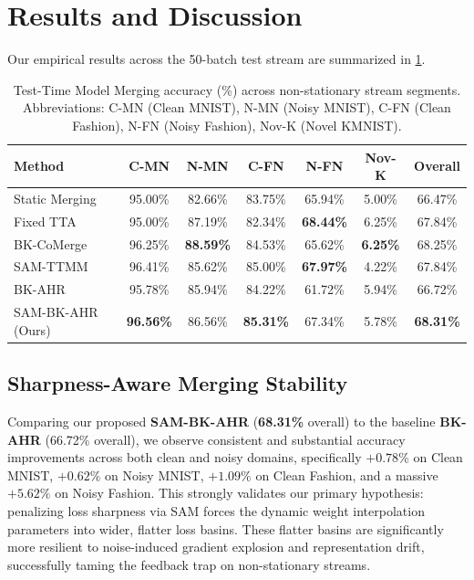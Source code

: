 \documentclass{article}
\theoremstyle{plain}
\theoremstyle{definition}
\theoremstyle{remark}
\begin{document}
\section{Results and Discussion}
\label{sec:results}

Our empirical results across the 50-batch test stream are summarized in \cref{tab:results}.

\begin{table}[t]
\caption{Test-Time Model Merging accuracy (\%) across non-stationary stream segments. Abbreviations: C-MN (Clean MNIST), N-MN (Noisy MNIST), C-FN (Clean Fashion), N-FN (Noisy Fashion), Nov-K (Novel KMNIST).}
\label{tab:results}
\vskip 0.15in
\begin{center}
\begin{small}
\begin{sc}
\begin{tabular}{lcccccc}
\toprule
Method & C-MN & N-MN & C-FN & N-FN & Nov-K & Overall \\
\midrule
Static Merging & 95.00\% & 82.66\% & 83.75\% & 65.94\% & 5.00\% & 66.47\% \\
Fixed TTA & 95.00\% & 87.19\% & 82.34\% & \textbf{68.44\%} & 6.25\% & 67.84\% \\
BK-CoMerge & 96.25\% & \textbf{88.59\%} & 84.53\% & 65.62\% & \textbf{6.25\%} & 68.25\% \\
SAM-TTMM & 96.41\% & 85.62\% & 85.00\% & \textbf{67.97\%} & 4.22\% & 67.84\% \\
BK-AHR & 95.78\% & 85.94\% & 84.22\% & 61.72\% & 5.94\% & 66.72\% \\
SAM-BK-AHR (Ours) & \textbf{96.56\%} & 86.56\% & \textbf{85.31\%} & 67.34\% & 5.78\% & \textbf{68.31\%} \\
\bottomrule
\end{tabular}
\end{sc}
\end{small}
\end{center}
\vskip -0.1in
\end{table}

\subsection{Sharpness-Aware Merging Stability}
Comparing our proposed \textbf{SAM-BK-AHR} (\textbf{68.31\%} overall) to the baseline \textbf{BK-AHR} (66.72\% overall), we observe consistent and substantial accuracy improvements across both clean and noisy domains, specifically $+0.78\%$ on Clean MNIST, $+0.62\%$ on Noisy MNIST, $+1.09\%$ on Clean Fashion, and a massive $+5.62\%$ on Noisy Fashion. This strongly validates our primary hypothesis: penalizing loss sharpness via SAM forces the dynamic weight interpolation parameters into wider, flatter loss basins. These flatter basins are significantly more resilient to noise-induced gradient explosion and representation drift, successfully taming the feedback trap on non-stationary streams.
\end{document}
